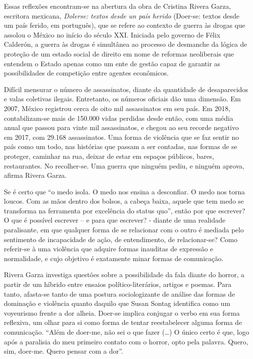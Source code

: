 Essas reflexões encontram-se na abertura da obra de Cristina Rivera
Garza, escritora mexicana, \emph{Dolerse: textos desde un país herido}
(Doer-se: textos desde um país ferido, em português), que se refere ao
contexto de guerra às drogas que assolou o México no início do século
XXI. Iniciada pelo governo de Félix Calderón, a guerra às drogas é
simultânea ao processo de desmanche da lógica de proteção de um estado
social de direito em nome de reformas neoliberais que entendem o Estado
apenas como um ente de gestão capaz de garantir as possibilidades de
competição entre agentes econômicos.

Difícil mensurar o número de assassinatos, diante da quantidade de
desaparecidos e valas coletivas ilegais. Entretanto, os números oficiais
dão uma dimensão. Em 2007, México registrou cerca de oito mil
assassinatos em seu país. Em 2018, contabilizam-se mais de 150.000 vidas
perdidas desde então, com uma média anual que passou para vinte mil
assassinatos, e chegou ao seu recorde negativo em 2017, com 29.168
assassinatos. Uma forma de violência que se faz sentir no país como um
todo, nas histórias que passam a ser contadas, nas formas de se
proteger, caminhar na rua, deixar de estar em espaços públicos, bares,
restaurantes. No recolher-se. Uma guerra que ninguém pediu, e ninguém
aprova, afirma Rivera Garza.

Se é certo que ``o medo isola. O medo nos ensina a desconfiar. O medo
nos torna loucos. Com as mãos dentro dos bolsos, a cabeça baixa, aquele
que tem medo se transforma na ferramenta por excelência do status quo'',
então por que escrever? O que é possível escrever -- e para que
escrever? - diante de uma realidade paralisante, em que qualquer forma
de se relacionar com o outro é mediada pelo sentimento de incapacidade
de ação, de entendimento, de relacionar-se? Como referir-se à uma
violência que adquire formas inauditas de expressão e normalidade, e
cujo objetivo é exatamente minar formas de comunicação.

Rivera Garza investiga questões sobre a possibilidade da fala diante do
horror, a partir de um híbrido entre ensaios político-literários,
artigos e poemas. Para tanto, afasta-se tanto de uma postura
sociologizante de análise das formas de dominação e violência quanto
daquilo que Susan Sontag identifica como um voyeurismo frente a dor
alheia. Doer-se implica conjugar o verbo em sua forma reflexiva, um
olhar para si como forma de tentar reestabelecer alguma forma de
comunicação. ``Além de doer-me, não sei o que fazer (\ldots{}) O único
certo é que, logo após a paralisia do meu primeiro contato com o horror,
opto pela palavra. Quero, sim, doer-me. Quero pensar com a dor''.

